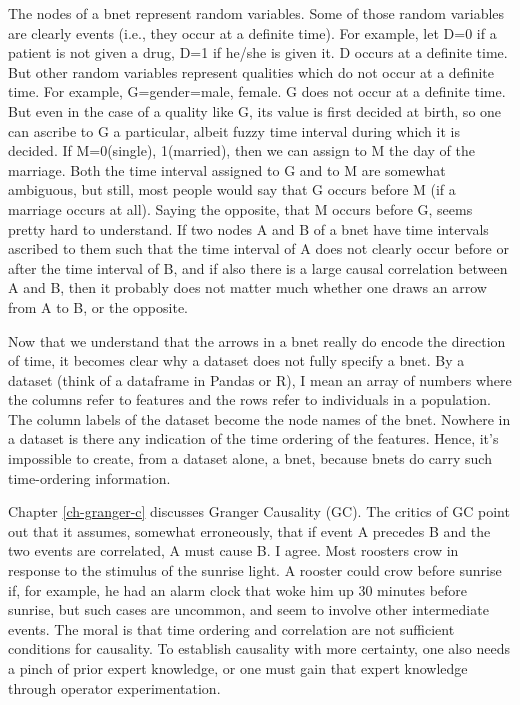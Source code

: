 The nodes of a bnet represent random variables. Some of those
random variables are clearly events (i.e., they occur at a definite time).
For example, let D=0 if a patient is not given a drug, D=1 if he/she is given
it. D occurs at a definite time. But other random variables represent
qualities which do not occur at a definite time. For example,
G=gender=male, female. G does not occur at a definite time.  But even in the
case of a quality like G, its value is first decided at birth, so one can
ascribe to G a particular, albeit fuzzy time interval during which it is
decided. If M=0(single), 1(married), then we can assign to M the day of the
marriage. Both the time interval assigned to G and to  M are somewhat
ambiguous, but still, most people would say that G occurs before M (if a
marriage occurs at all). Saying the opposite, that M occurs before G, seems
pretty hard to understand. If two nodes A and B of a bnet have time intervals
ascribed to them such that the time interval of A does not clearly occur
before or after the time interval of B, and if also there is a large causal
correlation between A and B, then it probably does not matter
much whether one draws an arrow from A to B, or the opposite.

Now that we understand that the arrows in a bnet really do encode the
direction of time, it becomes clear why a dataset does not fully specify a
bnet. By a dataset (think of a dataframe in Pandas or R), I mean an array of
numbers where the columns refer to features and the rows refer to individuals
in a population. The column labels of the dataset become the node names of
the bnet. Nowhere in a dataset is there any indication of the time ordering
of the features. Hence, it’s impossible to create, from a dataset alone, a
bnet, because bnets do carry such time-ordering information.

Chapter \ref{ch-granger-c} discusses
 Granger Causality
(GC). The critics of GC point out that it assumes, somewhat erroneously,
that if event A precedes B and the two events are correlated, A must
cause B. I agree. Most roosters crow in response to the stimulus of the
sunrise light.  A rooster could crow before sunrise if,  for example,  he
had an alarm clock that woke him up 30 minutes before sunrise, but such cases
are uncommon, and seem to involve other intermediate events.  The moral is
that time ordering and correlation are not sufficient
conditions for causality. To establish causality with more certainty, one
also needs a pinch of prior expert knowledge, or one must gain that expert
knowledge through  operator experimentation.



